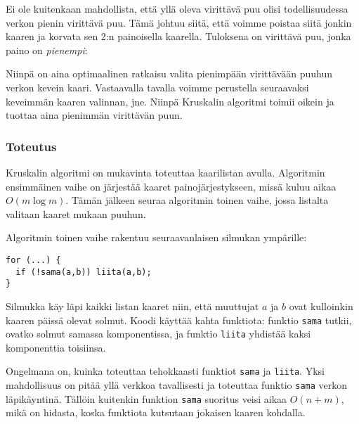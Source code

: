 Ei ole kuitenkaan mahdollista,
että yllä oleva virittävä puu olisi todellisuudessa
verkon pienin virittävä puu.
Tämä johtuu siitä, että voimme poistaa siitä
jonkin kaaren ja korvata sen 2:n painoisella kaarella.
Tuloksena on virittävä puu, jonka paino on \emph{pienempi}:

\begin{center}
\end{center}

Niinpä on aina optimaalinen ratkaisu valita pienimpään
virittävään puuhun verkon kevein kaari.
Vastaavalla tavalla voimme perustella
seuraavaksi keveimmän kaaren valinnan, jne.
Niinpä Kruskalin algoritmi toimii oikein ja
tuottaa aina pienimmän virittävän puun.

\subsubsection{Toteutus}

Kruskalin algoritmi on mukavinta toteuttaa
kaarilistan avulla. Algoritmin ensimmäinen vaihe
on järjestää kaaret painojärjestykseen,
missä kuluu aikaa $O(m \log m)$.
Tämän jälkeen seuraa algoritmin toinen vaihe,
jossa listalta valitaan kaaret mukaan puuhun.

Algoritmin toinen vaihe rakentuu seuraavanlaisen silmukan ympärille:

\begin{lstlisting}
for (...) {
  if (!sama(a,b)) liita(a,b);
}
\end{lstlisting}

Silmukka käy läpi kaikki listan kaaret
niin, että muuttujat $a$ ja $b$ ovat kulloinkin kaaren
päissä olevat solmut.
Koodi käyttää kahta funktiota:
funktio \texttt{sama} tutkii,
ovatko solmut samassa komponentissa,
ja funktio \texttt{liita}
yhdistää kaksi komponenttia toisiinsa.

Ongelmana on, kuinka toteuttaa tehokkaasti
funktiot \texttt{sama} ja \texttt{liita}.
Yksi mahdollisuus on pitää yllä verkkoa tavallisesti
ja toteuttaa funktio \texttt{sama} verkon läpikäyntinä.
Tällöin kuitenkin funktion \texttt{sama}
suoritus veisi aikaa $O(n+m)$,
mikä on hidasta, koska funktiota kutsutaan
jokaisen kaaren kohdalla.

